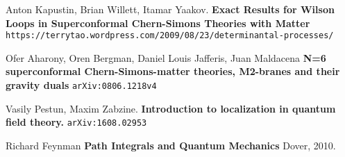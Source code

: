 \documentclass[12pt]{article}
\begin{document}
\selectfont \fontsize{12}{10}\selectfont

\begin{thebibliography}{}


\item Anton Kapustin, Brian Willett, Itamar Yaakov.  \textbf{Exact Results for Wilson Loops in Superconformal Chern-Simons Theories with Matter } \\ \texttt{https://terrytao.wordpress.com/2009/08/23/determinantal-processes/}

\item Ofer Aharony, Oren Bergman, Daniel Louis Jafferis, Juan Maldacena \textbf{N=6 superconformal Chern-Simons-matter theories, M2-branes and their gravity duals}
\texttt{arXiv:0806.1218v4}

\item Vasily Pestun, Maxim Zabzine. \textbf{Introduction to localization in quantum field theory.} \texttt{arXiv:1608.02953}

\item Richard Feynman \textbf{Path Integrals and Quantum Mechanics} Dover, 2010.


\end{thebibliography}
\end{document}
